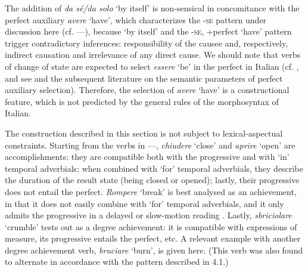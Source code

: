 \documentclass[output=paper,colorlinks,citecolor=brown
]{langscibook}
\begin{document}
The addition of\textit{ da sé/da solo} ‘by itself’ is non-sensical in concomitance with the perfect
auxiliary \textit{avere} ‘have’, which characterizes the -\textsc{se} pattern under discussion here
(cf. —), because ‘by itself’ and the {-\textsc{se}, +perfect ‘have’} pattern trigger contradictory inferences: responsibility of the causee and, respectively, indirect causation and irrelevance of any direct cause. We should note that verbs of change of state are expected to select \textit{essere} ‘be’ in the perfect in Italian (cf. ,  and see \cite{perlmutter1989multiattachment} and the subsequent literature on the semantic parameters of perfect auxiliary selection). Therefore, the selection of \textit{avere }‘have’ is a constructional feature, which is not predicted by the general rules of the morphosyntax of Italian.

The construction described in this section is not subject to lexical-aspectual constraints. Starting from the verbs in —, \textit{chiudere} ‘close’ and \textit{aprire} ‘open’ are accomplishments: they are compatible both with the progressive and with ‘in’ temporal adverbials; when combined with ‘for’ temporal adverbials, they describe the duration of the result state (being closed or opened); lastly, their progressive does not entail the perfect. \textit{Rompere} ‘break’ is best analysed as an achievement, in that it does not easily combine with ‘for’ temporal adverbials, and it only admits the progressive in a delayed or slow-motion reading \citep{bertinetto2016tense,vivanco2021scalar}. Lastly, \textit{sbriciolare} ‘crumble’ tests out as a degree achievement: it is compatible with expressions of measure, its progressive entails the perfect, etc. A relevant example with another degree achievement verb, \textit{bruciare} ‘burn’, is given here. (This verb was also found to alternate in accordance with the pattern described in 4.1.)
\end{document}
